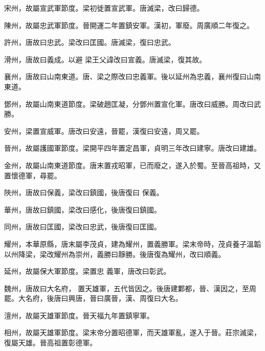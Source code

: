 \begin{pinyinscope}
 宋州，故屬宣武軍節度。梁初徙置宣武軍。唐滅梁，改曰歸德。



 陳州，故屬忠武軍節度。晉開運二年置鎮安軍。漢初，軍廢。周廣順二年復之。



 許州，唐故曰忠武。梁改曰匡國。唐滅梁，復曰忠武。



 滑州，唐故曰義成。以避
 梁王父諱改曰宣義。唐滅梁，復其故。



 襄州，唐故曰山南東道。唐、梁之際改曰忠義軍。後以延州為忠義，襄州復曰山南東道。



 鄧州，故屬山南東道節度。梁破趙匡凝，分鄧州置宣化軍。唐改曰威勝。周改曰武勝。



 安州，梁置宣威軍。唐改曰安遠，晉罷，漢復曰安遠，周又罷。



 晉州，故屬護國軍節度。梁開平四年置定昌軍，貞明三年改曰建寧。唐改曰建雄。



 金州，故屬山南東道節度。唐末置戎昭軍，已而廢之，遂入於蜀。至晉高祖時，又置懷德軍，尋罷。



 陜州，唐故曰保義，梁改曰鎮國，後唐復曰
 保義。



 華州，唐故曰鎮國，梁改曰感化，後唐復曰鎮國。



 同州，唐故曰匡國，梁改曰忠武，後唐復曰匡國。



 耀州，本華原縣，唐末屬李茂貞，建為耀州，置義勝軍。梁末帝時，茂貞養子溫韜以州降梁，梁改耀州為崇州，義勝曰靜勝。後唐復為耀州，改曰順義。



 延州，故屬保大軍節度。梁置忠
 義軍，唐改曰彰武。



 魏州，唐故曰大名府，
 置天雄軍，五代皆因之。後唐建鄴都，晉、漢因之，至周罷。大名府，後唐曰興唐，晉曰廣晉，漢、周復曰大名。



 澶州，故屬天雄軍節度。晉天福九年置鎮寧軍。



 相州，故屬天雄軍節度。梁末帝分置昭德軍，而天雄軍亂，遂入于晉。莊宗滅梁，復屬天雄。晉高祖置彰德軍。




\end{pinyinscope}
